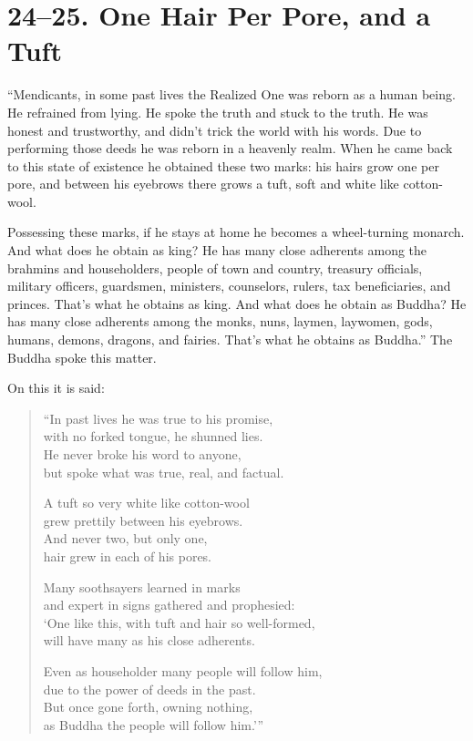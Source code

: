 \documentclass[12pt,openany]{book}%
\begin{document}
\section*{24–25. One Hair Per Pore, and a Tuft }

“Mendicants, in some past lives the Realized One was reborn as a human being. He refrained from lying. He spoke the truth and stuck to the truth. He was honest and trustworthy, and didn’t trick the world with his words. Due to performing those deeds he was reborn in a heavenly realm. When he came back to this state of existence he obtained these two marks: his hairs grow one per pore, and between his eyebrows there grows a tuft, soft and white like cotton-wool. 

Possessing these marks, if he stays at home he becomes a wheel-turning monarch. And what does he obtain as king? He has many close adherents among the brahmins and householders, people of town and country, treasury officials, military officers, guardsmen, ministers, counselors, rulers, tax beneficiaries, and princes. That’s what he obtains as king. And what does he obtain as Buddha? He has many close adherents among the monks, nuns, laymen, laywomen, gods, humans, demons, dragons, and fairies. That’s what he obtains as Buddha.” The Buddha spoke this matter. 

On this it is said: 

\begin{verse}%
“In past lives he was true to his promise, \\
with no forked tongue, he shunned lies. \\
He never broke his word to anyone, \\
but spoke what was true, real, and factual. 

A tuft so very white like cotton-wool \\
grew prettily between his eyebrows. \\
And never two, but only one, \\
hair grew in each of his pores. 

Many soothsayers learned in marks \\
and expert in signs gathered and prophesied: \\
‘One like this, with tuft and hair so well-formed, \\
will have many as his close adherents. 

Even as householder many people will follow him, \\
due to the power of deeds in the past. \\
But once gone forth, owning nothing, \\
as Buddha the people will follow him.’” 

%
\end{verse}
\end{document}

